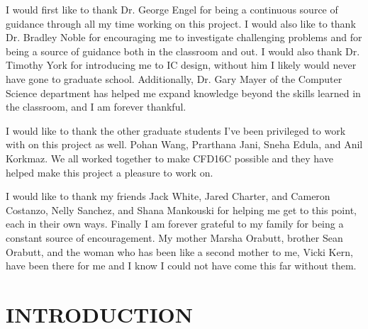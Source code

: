 \documentclass[12pt,oneside,final]{siuethesis}
\theoremstyle{definition}
\begin{document}
\begin{acknowledgements}

\par I would first like to thank Dr. George Engel for being a continuous source of guidance through all my time working on this project. I would also like to thank Dr. Bradley Noble for encouraging me to investigate challenging problems and for being a source of guidance both in the classroom and out. I would also thank Dr. Timothy York for introducing me to IC design, without him I likely would never have gone to graduate school. Additionally, Dr. Gary Mayer of the Computer Science department has helped me expand knowledge beyond the skills learned in the classroom, and I am forever thankful.
\par I would like to thank the other graduate students I've been privileged to work with on this project as well. Pohan Wang, Prarthana Jani, Sneha Edula, and Anil Korkmaz. We all worked together to make CFD16C possible and they have helped make this project a pleasure to work on.
\par I would like to thank my friends Jack White, Jared Charter, and Cameron Costanzo, Nelly Sanchez, and Shana Mankouski for helping me get to this point, each in their own ways. Finally I am forever grateful to my family for being a constant source of encouragement. My mother Marsha Orabutt, brother Sean Orabutt, and the woman who has been like a second mother to me, Vicki Kern, have been there for me and I know I could not have come this far without them.

\end{acknowledgements}

\tableofcontents

\cleardoublepage %

\listoffigures %

\cleardoublepage

\listoftables

\mainmatter %


\chapter{INTRODUCTION}  %
\end{document}
